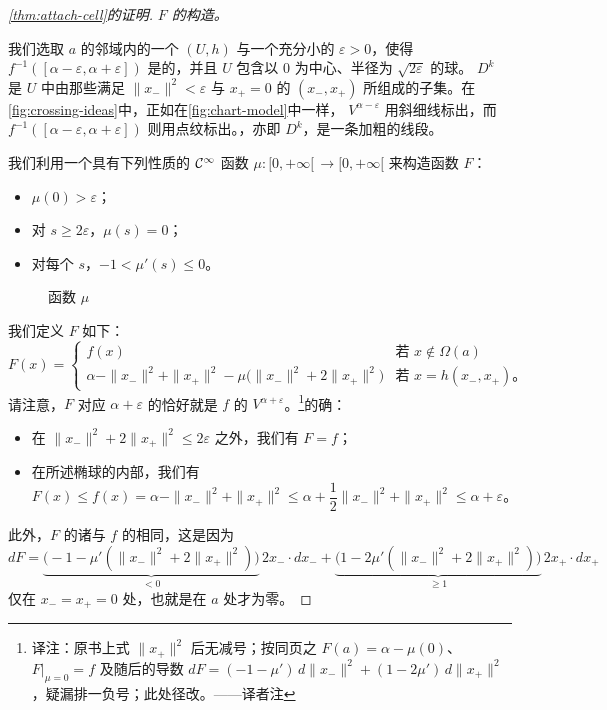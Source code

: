 \begin{proof}[\cref{thm:attach-cell}的证明]
\emph{$F$ 的构造。}

我们选取 $a$ 的邻域内的一个\trMorseChart{} $(U,h)$ 与一个充分小的 $\varepsilon>0$，使得 $f^{-1}([\alpha-\varepsilon,\alpha+\varepsilon])$ 是\trCompact{}的，并且 $U$ 包含以 $0$ 为中心、半径为 $\sqrt{2\varepsilon}$ 的球。\trDisk{} $D^k$ 是 $U$ 中由那些满足 $\|x_-\|^2<\varepsilon$ 与 $x_+=0$ 的 $(x_-,x_+)$ 所组成的子集。在\cref{fig:crossing-ideas}中，正如在\cref{fig:chart-model}中一样，\trSublevelSet{} $V^{\alpha-\varepsilon}$ 用斜细线标出，而 $f^{-1}([\alpha-\varepsilon,\alpha+\varepsilon])$ 则用点纹标出。\trCellular，亦即\trDisk{} $D^k$，是一条加粗的线段。

我们利用一个具有下列性质的 $\mathcal{C}^\infty$ 函数 $\mu\colon[0,+\infty[\,\to[0,+\infty[$ 来构造函数 $F$：
\begin{itemize}
\item $\mu(0)>\varepsilon$；
\item 对 $s\ge 2\varepsilon$，$\mu(s)=0$；
\item 对每个 $s$，$-1<\mu'(s)\le 0$。
\end{itemize}

\begin{figure}[htbp]
\centering
{}
\caption{函数 $\mu$}
\label{fig:mu-function}
\end{figure}

我们定义 $F$ 如下：
\[
F(x)=
\begin{cases}
f(x) & \text{若 } x\notin\Omega(a)\\[1ex]
\alpha-\|x_-\|^2+\|x_+\|^2-\mu\bigl(\|x_-\|^2+2\|x_+\|^2\bigr) & \text{若 } x=h(x_-,x_+)\text{。}
\end{cases}
\]
请注意，$F$ 对应 $\alpha+\varepsilon$ 的\trSublevelSet{}恰好就是 $f$ 的\trSublevelSet{} $V^{\alpha+\varepsilon}$。\footnote{译注：原书上式 $\|x_+\|^2$ 后无减号；按同页之 $F(a)=\alpha-\mu(0)$、$F|_{\mu=0}=f$ 及随后的导数 $dF=(-1-\mu')\,d\|x_-\|^2+(1-2\mu')\,d\|x_+\|^2$，疑漏排一负号；此处径改。——译者注}的确：
\begin{itemize}
\item 在 $\|x_-\|^2+2\|x_+\|^2\le 2\varepsilon$ 之外，我们有 $F=f$；
\item 在所述椭球的内部，我们有
\[
F(x)\le f(x)=\alpha-\|x_-\|^2+\|x_+\|^2
\le\alpha+\frac{1}{2}\|x_-\|^2+\|x_+\|^2\le\alpha+\varepsilon\text{。}
\]
\end{itemize}
此外，$F$ 的诸\trCriticalPoint{}与 $f$ 的相同，这是因为
\[
dF=\underbrace{\bigl(-1-\mu'(\|x_-\|^2+2\|x_+\|^2)\bigr)}_{<0}\,2x_-\cdot dx_-
+\underbrace{\bigl(1-2\mu'(\|x_-\|^2+2\|x_+\|^2)\bigr)}_{\ge 1}\,2x_+\cdot dx_+
\]
仅在 $x_-=x_+=0$ 处，也就是在 $a$ 处才为零。


\end{proof}
